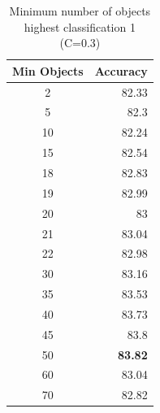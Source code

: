 \documentclass[12pt]{article}
\begin{document}
\begin{table}[htbp]
  \centering
  \caption{Minimum number of objects highest classification 1 (C=0.3)}
    \begin{tabular}{c|r}
    \toprule
    \multicolumn{1}{l|}{Min Objects} & \multicolumn{1}{l}{Accuracy} \\
    \midrule
    2     & 82.33 \\
    5     & 82.3 \\
    10    & 82.24 \\
    15    & 82.54 \\
    18    & 82.83 \\
    19    & 82.99 \\
    20    & 83 \\
    21    & 83.04 \\
    22    & 82.98 \\
    30    & 83.16 \\
    35    & 83.53 \\
    40    & 83.73 \\
    45    & 83.8 \\
    50    & \textbf{83.82} \\
    60    & 83.04 \\
    70    & 82.82 \\
    \bottomrule
    \end{tabular}%
  \label{tab:addlabel}%
\end{table}%
\end{document}
